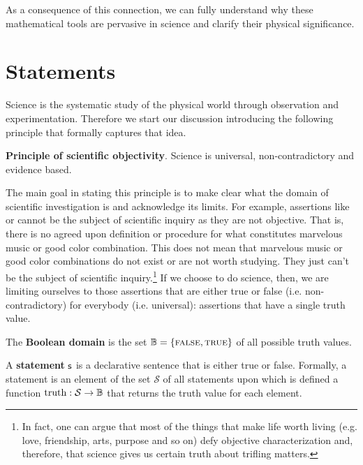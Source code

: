 \documentclass[11pt,letterpaper,fleqn]{memoir} %
\begin{document}
As a consequence of this connection, we can fully understand why these mathematical tools are pervasive in science and clarify their physical significance.

\section{Statements}

Science is the systematic study of the physical world through observation and experimentation. Therefore we start our discussion introducing the following principle that formally captures that idea.

\begin{mathSection}
	\textbf{Principle of scientific objectivity}.
		Science is universal, non-contradictory and evidence based.
\end{mathSection}

The main goal in stating this principle is to make clear what the domain of scientific investigation is and acknowledge its limits. For example, assertions like  or  cannot be the subject of scientific inquiry as they are not objective. That is, there is no agreed upon definition or procedure for what constitutes marvelous music or good color combination. This does not mean that marvelous music or good color combinations do not exist or are not worth studying. They just can't be the subject of scientific inquiry.\footnote{In fact, one can argue that most of the things that make life worth living (e.g. love, friendship, arts, purpose and so on) defy objective characterization and, therefore, that science gives us certain truth about trifling matters.} If we choose to do science, then, we are limiting ourselves to those assertions that are either true or false (i.e. non-contradictory) for everybody (i.e. universal): assertions that have a single truth value.

\begin{mathSection}
\begin{defn}
	The \textbf{Boolean domain} is the set $\mathbb{B} = \{\textsc{false}, \textsc{true}\}$ of all possible truth values.
\end{defn}


\begin{defn}\label{def_statement}
	A \textbf{statement} $\mathsf{s}$ is a declarative sentence that is either true or false. Formally, a statement is an element of the set $\mathcal{S}$ of all statements upon which is defined a function $\operatorname{truth}: \mathcal{S} \to \mathbb{B}$ that returns the truth value for each element.
\end{defn}

\end{mathSection}
\end{document}
